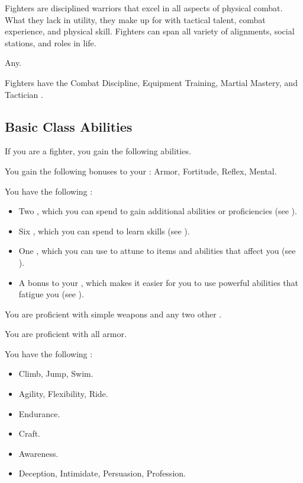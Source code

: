     Fighters are disciplined warriors that excel in all aspects of physical combat.
    What they lack in utility, they make up for with tactical talent, combat experience, and physical skill.
    Fighters can span all variety of alignments, social stations, and roles in life.

     Any.

     Fighters have the Combat Discipline, Equipment Training, Martial Mastery, and Tactician .

    \subsection{Basic Class Abilities}
        If you are a fighter, you gain the following abilities.

        You gain the following bonuses to your :  Armor,  Fortitude,  Reflex,  Mental.

         You have the following :
        \begin{itemize}
            \item Two , which you can spend to gain additional abilities or proficiencies (see ).
            \item Six , which you can spend to learn skills (see ).
            \item One , which you can use to attune to items and abilities that affect you (see ).
            \item A  bonus to your , which makes it easier for you to use powerful abilities that fatigue you (see ).
        \end{itemize}

        You are proficient with simple weapons and any two other .

        You are proficient with all armor.

        You have the following :
        \begin{itemize}
            \item {} Climb, Jump, Swim.
            \item {} Agility, Flexibility, Ride.
            \item {} Endurance.
            \item {} Craft.
            \item {} Awareness.
            \item {} Deception, Intimidate, Persuasion, Profession.
        \end{itemize}

